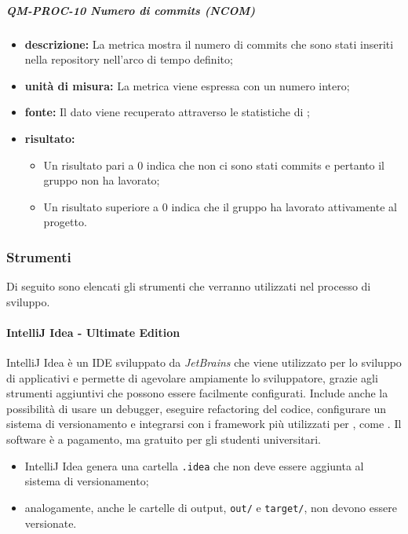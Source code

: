 			\subparagraph{QM-PROC-10 Numero di commits (NCOM)}

			\begin{itemize}
      			\item \textbf{descrizione: }
				La metrica mostra il numero di commits che sono stati inseriti nella repository nell'arco di tempo definito;

				\item \textbf{unità di misura: }
				La metrica viene espressa con un numero intero;

				\item \textbf{fonte: }
				Il dato viene recuperato attraverso le statistiche di ;

				\item \textbf{risultato: }
				\begin{itemize}
					\item Un risultato pari a 0 indica che non ci sono stati commits e pertanto il gruppo non ha lavorato;
					\item Un risultato superiore a 0 indica che il gruppo ha lavorato attivamente al progetto.
				\end{itemize}
			\end{itemize}



		\subsubsection{Strumenti}
			Di seguito sono elencati gli strumenti che verranno utilizzati nel processo di sviluppo.

				\paragraph{IntelliJ Idea - Ultimate Edition}
					IntelliJ Idea è un IDE sviluppato da \textit{JetBrains} che viene utilizzato per lo sviluppo di applicativi  e permette di agevolare ampiamente lo sviluppatore, grazie agli strumenti aggiuntivi che possono essere facilmente configurati.
					\newline
					Include anche la possibilità di usare un debugger, eseguire refactoring del codice, configurare un sistema di versionamento e integrarsi con i framework più utilizzati per , come .
					\newline
					Il software è a pagamento, ma gratuito per gli studenti universitari.

					\begin{itemize}
						\item IntelliJ Idea genera una cartella \verb!.idea! che non deve essere aggiunta al sistema di versionamento;
						\item analogamente, anche le cartelle di output, \verb!out/! e \verb!target/!, non devono essere versionate.
					\end{itemize}

